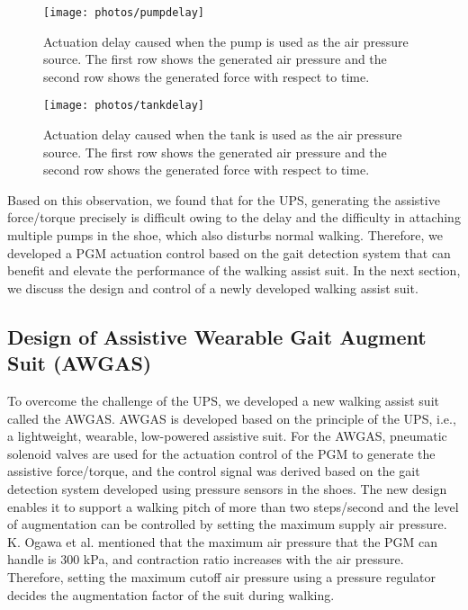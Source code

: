 \documentclass[paper,JRM,paper]{jaciiiarticle}
\begin{document}
\begin{figure}[h]
	\centering
	\texttt{[image: photos/pumpdelay]}
	\caption{Actuation delay caused when the pump is used as the air pressure source. The first row shows the generated air pressure and the second row shows the generated force with respect to time.}
	\label{fig:pump}
\end{figure}

\begin{figure}
	\centering
	\texttt{[image: photos/tankdelay]}
	\caption{Actuation delay caused when the tank is used as the air pressure source. The first row shows the generated air pressure and the second row shows the generated force with respect to time.}
	\label{fig:tank}
\end{figure}

Based on this observation, we found that for the UPS, generating the assistive force/torque precisely is difficult owing to the delay and the difficulty in attaching multiple pumps in the shoe, which also disturbs normal walking. Therefore, we developed a PGM actuation control based on the gait detection system that can benefit and elevate the performance of the walking assist suit. In the next section, we discuss the design and control of a newly developed walking assist suit.

\subsection{Design of Assistive Wearable Gait Augment Suit (AWGAS)}
To overcome the challenge of the UPS, we developed a new walking assist suit called the AWGAS. AWGAS is developed based on the principle of the UPS, i.e., a lightweight, wearable, low-powered assistive suit. For the AWGAS, pneumatic solenoid valves are used for the actuation control of the PGM to generate the assistive force/torque, and the control signal was derived based on the gait detection system developed using pressure sensors in the shoes. The new design enables it to support a walking pitch of more than two steps/second and the level of augmentation can be controlled by setting the maximum supply air pressure.  K. Ogawa et al. mentioned that the maximum air pressure that the PGM can handle is 300 kPa, and contraction ratio increases with the air pressure. Therefore, setting the maximum cutoff air pressure using a pressure regulator decides the augmentation factor of the suit during walking. 
\end{document}
